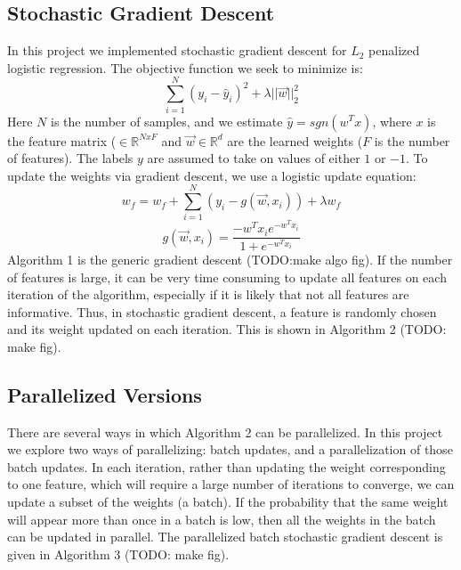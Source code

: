 \documentclass{article}
\begin{document}
\subsection{Stochastic Gradient Descent}
In this project we implemented stochastic gradient descent for $L_2$ penalized logistic regression. The objective function we seek to minimize is:
\begin{equation}
\sum_{i = 1}^{N}(y_i - \hat{y}_i)^2 + \lambda||\vec{w}||_2^2
\end{equation}
Here $N$ is the number of samples, and we estimate $\hat{y} = sgn(w^Tx)$,
where $x$ is the feature matrix ($\in \mathbb{R}^{NxF}$ and $\vec{w} \in \mathbb{R}^d$ are the learned weights ($F$ is the number of features). The labels $y$ are assumed to take on values of either $1$ or $-1$. To update the weights via gradient descent, we use a logistic update equation:
\begin{equation}
w_f = w_f + \sum_{i = 1}^{N}(y_i - g(\vec{w}, x_i)) + \lambda w_f
\end{equation}
\begin{equation}
g(\vec{w}, x_i) = \frac{-w^Tx_ie^{-w^Tx_i}}{1 + e^{-w^Tx_i}}
\end{equation}
Algorithm 1 is the generic gradient descent (TODO:make algo fig). If the number of features is large, it can be very time consuming to update all features on each iteration of the algorithm, especially if it is likely that not all features are informative.  Thus, in stochastic gradient descent, a feature is randomly chosen and its weight updated on each iteration. This is shown in Algorithm 2 (TODO: make fig).
\subsection{Parallelized Versions}
There are several ways in which Algorithm 2 can be parallelized. In this project we explore two ways of parallelizing: batch updates, and a parallelization of those batch updates.  In each iteration, rather than updating the weight corresponding to one feature, which will require a large number of iterations to converge, we can update a subset of the weights (a batch).  If the probability that the same weight will appear more than once in a batch is low, then all the weights in the batch can be updated in parallel. The parallelized batch stochastic gradient descent is given in Algorithm 3 (TODO: make fig).
\end{document}
